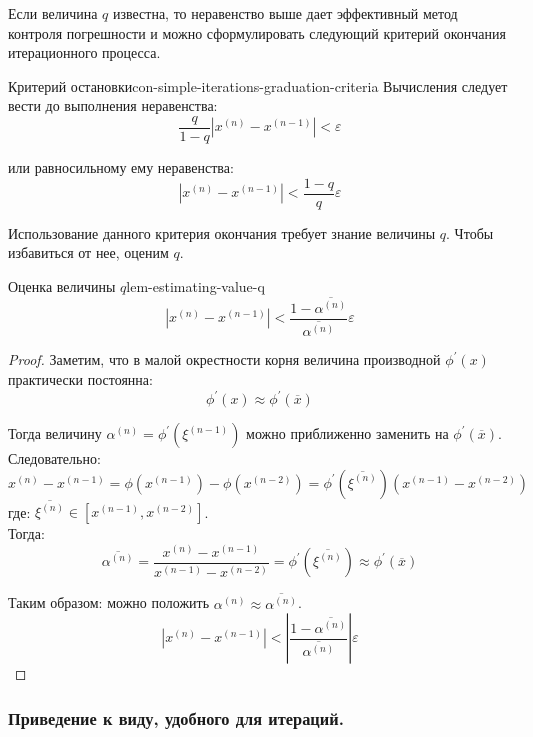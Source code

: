 \documentclass[14pt]{extarticle}
\begin{document}
        Если величина $q$ известна, то неравенство выше дает эффективный метод контроля погрешности и можно сформулировать следующий критерий окончания итерационного процесса.

        \begin{consequence}{Критерий остановки}{con-simple-iterations-graduation-criteria}
            Вычисления следует вести до выполнения неравенства:
            $$\frac{q}{1 - q}|x^{(n)} - x^{(n - 1)}| < \varepsilon$$
            
            или равносильному ему неравенства:
            $$|x^{(n)} - x^{(n - 1)}| < \frac{1-q}{q} \varepsilon$$
        \end{consequence}

        Использование данного критерия окончания требует знание величины $q$. Чтобы избавиться от нее, оценим $q$.

        \begin{lemma}{Оценка величины $q$}{lem-estimating-value-q}
            $$|x^{(n)} - x^{(n - 1)}| < \frac{1 - \overline{\alpha^{(n)}}}{\overline{\alpha^{(n)}}} \varepsilon$$

            \begin{proof}
                Заметим, что в малой окрестности корня величина производной $\phi^{'}(x)$ практически постоянна: 
                $$\phi^{'}(x) \approx \phi^{'}(\overline{x})$$

                Тогда величину $\alpha^{(n)} = \phi^{'}(\xi^{(n - 1)})$ можно приближенно заменить на $\phi^{'}(\overline{x})$.\\
                Следовательно:
                $$x^{(n)} - x^{(n - 1)} = \phi(x^{(n - 1)}) - \phi(x^{(n - 2)}) = \phi^{'}(\overline{\xi^{(n)}})(x^{(n - 1)} - x^{(n - 2)})$$
                где: $\overline{\xi^{(n)}} \in [x^{(n - 1)}, x^{(n - 2)}]$.\\

                Тогда:
                $$\overline{\alpha^{(n)}} = \frac{x^{(n)} - x^{(n - 1)}}{x^{(n - 1)} - x^{(n - 2)}} = \phi^{'}(\overline{\xi^{(n)}}) \approx \phi^{'}(\overline{x})$$
            
                Таким образом: можно положить $\alpha^{(n)} \approx \overline{\alpha^{(n)}}$.
                $$|x^{(n)} - x^{(n - 1)}| < |\frac{1 - \overline{\alpha^{(n)}}}{\overline{\alpha^{(n)}}}| \varepsilon$$
            \end{proof}
        \end{lemma}

    \clearpage
    \subsubsection{Приведение к виду, удобного для итераций.}
        
\end{document}
